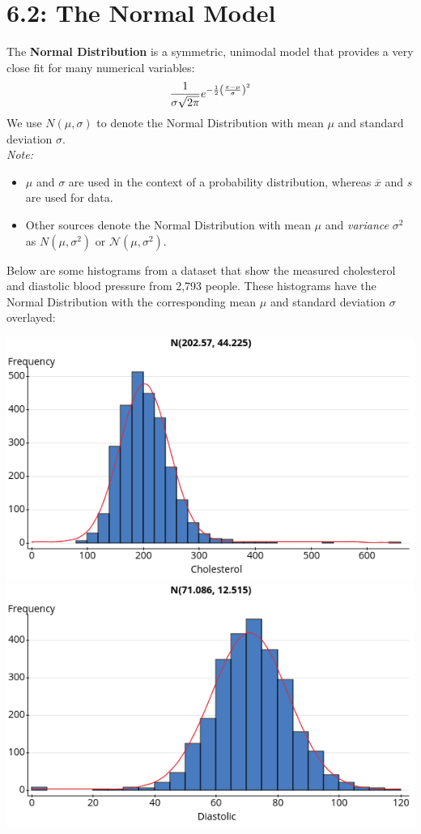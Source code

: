 \documentclass[../mathNotesPreamble]{subfiles}
\providecommand{\relscalefact}{1.4}
\begin{document}
\relscale{\relscalefact}
  \section{6.2: The Normal Model}
    \begin{defn*}
      The \textbf{Normal Distribution} is a symmetric, unimodal model that provides a very close fit for many numerical variables:
      \[\frac{1}{\sigma\sqrt{2\pi}} e^{-\frac{1}{2}{\left(\frac{x-\mu}{\sigma}\right)}^2}\]
      We use $N(\mu,\sigma)$ to denote the Normal Distribution with mean $\mu$ and standard deviation $\sigma$. \\
      \emph{Note:}
        \begin{itemize}
          \item $\mu$ and $\sigma$ are used in the context of a probability distribution, whereas $\overline{x}$ and $s$ are used for data.
          \item Other sources denote the Normal Distribution with mean $\mu$ and \emph{variance} $\sigma^2$ as $N(\mu,\sigma^2)$ or $\mathcal{N}(\mu,\sigma^2)$.
        \end{itemize}
    \end{defn*}

    \begin{ex*}
      Below are some histograms from a dataset that show the measured cholesterol and diastolic blood pressure from 2,793 people. These histograms have the Normal Distribution with the corresponding mean $\mu$ and standard deviation $\sigma$ overlayed:
    \end{ex*}
    \begin{center}
      \includegraphics[width=0.49\linewidth]{images/math211_figure_6p9a}
      \includegraphics[width=0.49\linewidth]{images/math211_figure_6p9b}%
%
%
    \end{center}
    \pagebreak
\end{document}
